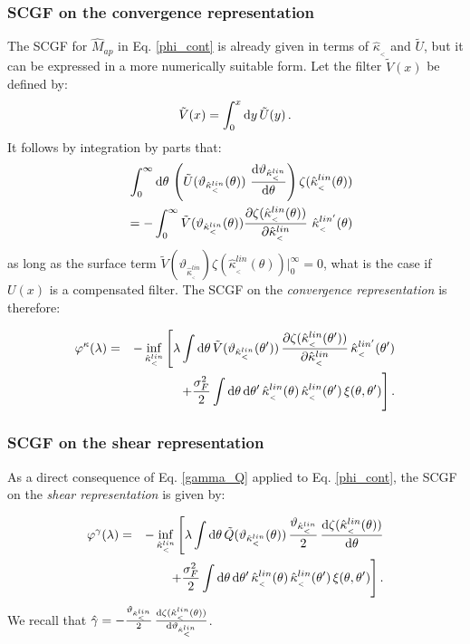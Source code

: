\documentclass[twocolumn,aps,reprint, nofootinbib]{revtex4}
\newcommand{\dd}{{\rm d}}
\newcommand{\hkappa}{\hat{\kappa}_{_<}}
\newcommand{\hgamma}{\hat{\gamma}}
\newcommand{\tU}{\tilde{U}}
\newcommand{\tQ}{\tilde{Q}}
\newcommand{\tV}{\tilde{V}}
\newcommand{\vark}{\vartheta_{\hkappa^{lin}}}
\newcommand{\Map}{\hat{M}_{ap}}
\newcommand{\varphik}{\varphi^{\kappa}}
\newcommand{\varphig}{\varphi^{\gamma}}
\begin{document}
\subsubsection{SCGF on the convergence representation}

The SCGF for $\Map$ in Eq. \eqref{phi_cont} is already given in terms of $\hkappa$ and $\tU$, but it can be expressed in a more numerically suitable form.  Let the filter $\tV(x)$ be defined by:
\begin{equation}
\label{V_def}
\tV(x) = \int_0^{x} \dd y \, \tU(y) \, .
\end{equation}
It follows by integration by parts that:
\begin{eqnarray}
\label{ipp_V}
& & \int_0^{\infty} \dd \theta \, \left( \tU(\vark(\theta)) \, \, \frac{\dd \vark}{\dd \theta} \right) \zeta(\hkappa^{lin} (\theta))  \nonumber\\ & & = - \int_0^{\infty} \tV(\vark(\theta)) \frac{\partial\zeta(\hkappa^{lin}(\theta))}{\partial \hkappa^{lin}} \ \hkappa^{lin'}(\theta)
\end{eqnarray}
as long as the surface term $\tV(\vark) \zeta(\hkappa^{lin}(\theta))|_0^{\infty} = 0$, what is the case if $U(x)$ is a compensated filter. The SCGF on the \emph{convergence representation} is therefore:

\begin{eqnarray}
\label{phi_cont_k}
\varphik(\lambda) & = & - \inf_{\hkappa^{lin}} \Bigg[  \lambda \int \dd \theta \, \tV(\vark(\theta')) \, \frac{\partial\zeta(\hkappa^{lin}(\theta'))}{\partial \hkappa^{lin}}  \, \hkappa^{lin'}(\theta')  \nonumber\\ & & + \frac{\sigma^2_{F}}{2} \int \dd \theta \, \dd \theta' \, \hkappa^{lin} (\theta) \, \hkappa^{lin} (\theta') \, \xi(\theta, \theta') \Bigg] \, .
\end{eqnarray} 


\subsubsection{SCGF on the shear representation}

As a direct consequence of Eq. \eqref{gamma_Q} applied to Eq. \eqref{phi_cont}, the SCGF on the \emph{shear representation} is given by:

\begin{eqnarray}
\label{phi_cont_shear}
\varphig(\lambda) & = &  - \inf_{\hkappa^{lin}} \Bigg[  \lambda \int \dd \theta \, \tQ (\vark(\theta)) \,  \frac{ \vark}{2} \, \frac{\dd \zeta(\hkappa^{lin} (\theta))}{\dd \theta} \nonumber\\ & & + \frac{\sigma^2_{F}}{2} \int \dd \theta \, \dd \theta' \, \hkappa^{lin} (\theta) \, \hkappa^{lin} (\theta') \, \xi(\theta, \theta') \Bigg] \, .
\end{eqnarray}
We recall that $ \hgamma  = -\frac{ \vark}{2} \, \frac{\dd \zeta(\hkappa^{lin} (\theta))}{\dd \vark}$.
\end{document}
